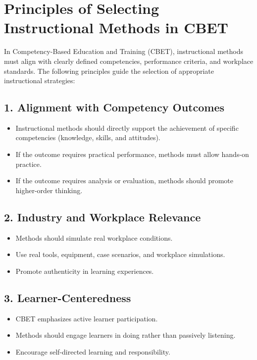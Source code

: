 \documentclass[12pt,a4paper]{article}
\begin{document}
\section*{Principles of Selecting Instructional Methods in CBET}
In Competency-Based Education and Training (CBET), instructional methods must align with clearly defined competencies, performance criteria, and workplace standards. The following principles guide the selection of appropriate instructional strategies:

\subsection*{1. Alignment with Competency Outcomes}
\begin{itemize}
    \item Instructional methods should directly support the achievement of specific competencies (knowledge, skills, and attitudes).
    \item If the outcome requires practical performance, methods must allow hands-on practice.
    \item If the outcome requires analysis or evaluation, methods should promote higher-order thinking.
\end{itemize}

\subsection*{2. Industry and Workplace Relevance}
\begin{itemize}
    \item Methods should simulate real workplace conditions.
    \item Use real tools, equipment, case scenarios, and workplace simulations.
    \item Promote authenticity in learning experiences.
\end{itemize}

\subsection*{3. Learner-Centeredness}
\begin{itemize}
    \item CBET emphasizes active learner participation.
    \item Methods should engage learners in doing rather than passively listening.
    \item Encourage self-directed learning and responsibility.
\end{itemize}
\end{document}
